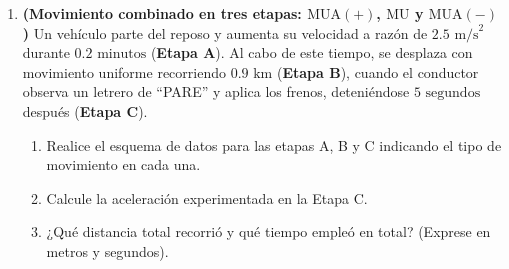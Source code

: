 \documentclass[11pt, letterpaper]{article}
\newif\ifmostrarrespuestas
\newcommand{\respuesta}[1]{
	\ifmostrarrespuestas
	\par\vspace{0.2cm}
	\begin{tcolorbox}[colback=blue!5!white, colframe=valblue, boxrule=0.5pt, arc=1mm, left=2mm, right=2mm, top=1.5mm, bottom=1.5mm]
		\footnotesize \textbf{\textcolor{valblue}{Solución:}} \textcolor{blue!80!black}{#1}
	\end{tcolorbox}
	\vspace{0.2cm}
	\fi
}
\begin{document}
\begin{enumerate}[leftmargin=*, itemsep=0.6cm]
		\item \textbf{(Movimiento combinado en tres etapas: $\text{MUA}(+)$, $\text{MU}$ y $\text{MUA}(-)$)} Un vehículo parte del reposo y aumenta su velocidad a razón de $2.5\text{ m/s}^2$ durante $0.2\text{ minutos}$ (\textbf{Etapa A}). Al cabo de este tiempo, se desplaza con movimiento uniforme recorriendo $0.9\text{ km}$ (\textbf{Etapa B}), cuando el conductor observa un letrero de ``PARE'' y aplica los frenos, deteniéndose $5\text{ segundos}$ después (\textbf{Etapa C}).
		\begin{enumerate}[label=\alph*., itemsep=0.2cm]
			\item Realice el esquema de datos para las etapas A, B y C indicando el tipo de movimiento en cada una.
			\item Calcule la aceleración experimentada en la Etapa C.
			\item ¿Qué distancia total recorrió y qué tiempo empleó en total? (Exprese en metros y segundos).
		\end{enumerate}
		\respuesta{
			\textbf{Etapa A ($\text{MUA}(+)$):} $v_{0A}=0$, $a_A=2.5\text{ m/s}^2$, $t_A = 0.2\text{ min} = 12\text{ s}$.\\
			$v_{fA} = 0 + (2.5)(12) = \mathbf{30\text{ m/s}}$. Distancia A: $x_A = 0 + 0 + \frac{2.5(12)^2}{2} = \mathbf{180\text{ m}}$.\\[0.1cm]
			\textbf{Etapa B ($\text{MU}$):} $v_B = v_{fA} = 30\text{ m/s}$, $d_B = 0.9\text{ km} = \mathbf{900\text{ m}}$. Tiempo B: $t_B = \frac{900\text{ m}}{30\text{ m/s}} = \mathbf{30\text{ s}}$.\\[0.1cm]
			\textbf{Etapa C ($\text{MUA}(-)$):} $v_{0C} = 30\text{ m/s}$, $v_{fC} = 0\text{ m/s}$, $t_C = 5\text{ s}$.\\
			Aceleración C: $a_C = \frac{0 - 30}{5} = \mathbf{-6\text{ m/s}^2}$. Distancia C: $x_C = 30(5) + \frac{(-6)(5)^2}{2} = 150 - 75 = \mathbf{75\text{ m}}$.\\[0.1cm]
			\textbf{Totales:} $x_{\text{total}} = 180 + 900 + 75 = \mathbf{1155\text{ m}}$ \quad | \quad $t_{\text{total}} = 12 + 30 + 5 = \mathbf{47\text{ s}}$.
		}
		

\end{enumerate}
\end{document}
